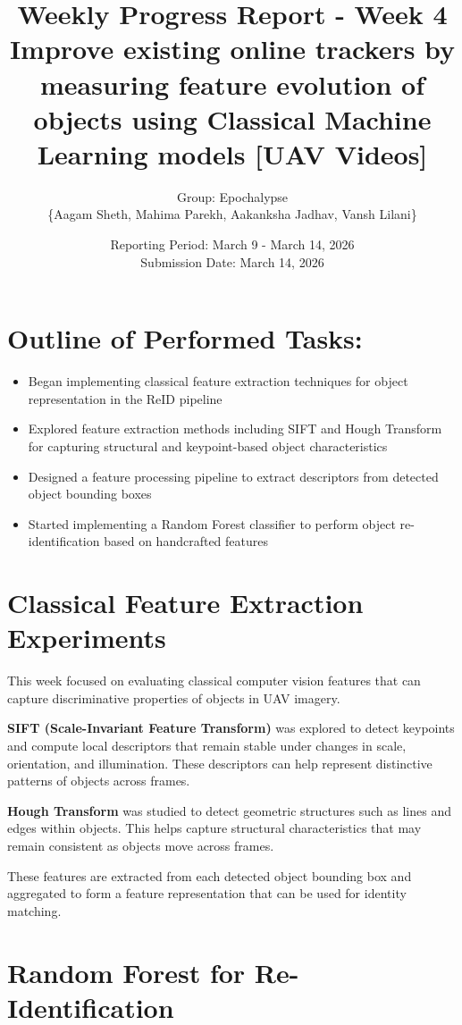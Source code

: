 \documentclass[11pt,a4paper]{article}
\title{\textbf{Weekly Progress Report - Week 4} \\
	\large Improve existing online trackers by measuring feature evolution of objects using
	Classical Machine Learning models [UAV Videos]}
\author{Group: Epochalypse\\\{Aagam Sheth, Mahima Parekh, Aakanksha Jadhav, Vansh Lilani\}}
\date{Reporting Period: March 9 - March 14, 2026 \\
	Submission Date: March 14, 2026}
\begin{document}
	
	\maketitle
	
	\section*{Outline of Performed Tasks:}
	\begin{itemize}[leftmargin=*]
		\item Began implementing classical feature extraction techniques for object representation in the ReID pipeline
		\item Explored feature extraction methods including SIFT and Hough Transform for capturing structural and keypoint-based object characteristics
		\item Designed a feature processing pipeline to extract descriptors from detected object bounding boxes
		\item Started implementing a Random Forest classifier to perform object re-identification based on handcrafted features
	\end{itemize}
	
	\section*{Classical Feature Extraction Experiments}
	
	This week focused on evaluating classical computer vision features that can capture discriminative properties of objects in UAV imagery.
	
	\textbf{SIFT (Scale-Invariant Feature Transform)} was explored to detect keypoints and compute local descriptors that remain stable under changes in scale, orientation, and illumination. These descriptors can help represent distinctive patterns of objects across frames.
	
	\textbf{Hough Transform} was studied to detect geometric structures such as lines and edges within objects. This helps capture structural characteristics that may remain consistent as objects move across frames.
	
	These features are extracted from each detected object bounding box and aggregated to form a feature representation that can be used for identity matching.
	
	\section*{Random Forest for Re-Identification}
	
\end{document}
